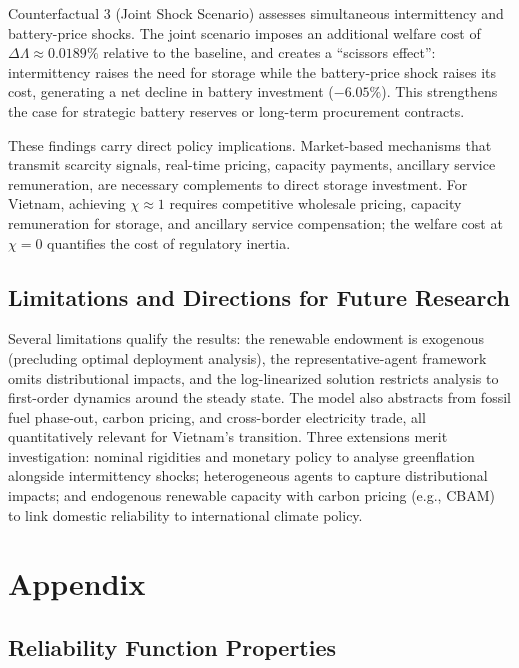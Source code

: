 	Counterfactual 3 (Joint Shock Scenario) assesses simultaneous intermittency and battery-price shocks. The joint scenario imposes an additional welfare cost of $\Delta\Lambda \approx 0.0189\%$ relative to the baseline, and creates a ``scissors effect'': intermittency raises the need for storage while the battery-price shock raises its cost, generating a net decline in battery investment ($-6.05\%$). This strengthens the case for strategic battery reserves or long-term procurement contracts.

	These findings carry direct policy implications. Market-based mechanisms that transmit scarcity signals, real-time pricing, capacity payments, ancillary service remuneration, are necessary complements to direct storage investment. For Vietnam, achieving $\chi \approx 1$ requires competitive wholesale pricing, capacity remuneration for storage, and ancillary service compensation; the welfare cost at $\chi=0$ quantifies the cost of regulatory inertia.

	\subsection*{Limitations and Directions for Future Research}

	Several limitations qualify the results: the renewable endowment is exogenous (precluding optimal deployment analysis), the representative-agent framework omits distributional impacts, and the log-linearized solution restricts analysis to first-order dynamics around the steady state. The model also abstracts from fossil fuel phase-out, carbon pricing, and cross-border electricity trade, all quantitatively relevant for Vietnam's transition. Three extensions merit investigation: nominal rigidities and monetary policy to analyse greenflation \citep{airaudo2025green} alongside intermittency shocks; heterogeneous agents to capture distributional impacts; and endogenous renewable capacity with carbon pricing (e.g., CBAM) to link domestic reliability to international climate policy.


	\clearpage
	
	

	\appendix
	
	\clearpage
	\section{Appendix}
	
	\subsection{Reliability Function Properties} \label{app:reliability}
	
